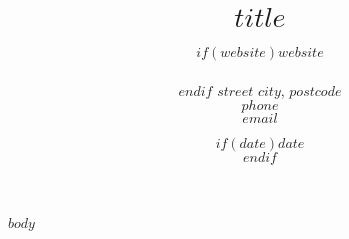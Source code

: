 \documentclass[11pt, a4paper]{article}
\title{$title$} %
\date{$if(date)$$date$\\$endif$} %
\author{$if(website)$$website$\\\\$endif$
$street$ $city$, $postcode$\\ %
$phone$ \\ $email$ } %
\begin{document}
\maketitle
\begin{raggedright}
	\justify
$body$
\end{raggedright}
\end{document}
